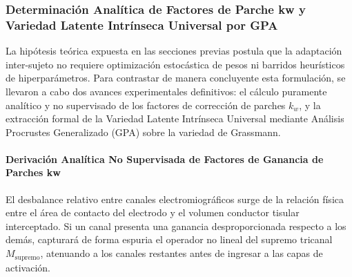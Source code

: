 \documentclass[11pt,a4paper]{article}
\begin{document}
\subsubsection{Determinación Analítica de Factores de Parche kw y Variedad Latente Intrínseca Universal por GPA}
\label{subsubsec:kw_analitico_y_variedad_gpa}

La hipótesis teórica expuesta en las secciones previas postula que la adaptación inter-sujeto no requiere optimización estocástica de pesos ni barridos heurísticos de hiperparámetros. Para contrastar de manera concluyente esta formulación, se llevaron a cabo dos avances experimentales definitivos: el cálculo puramente analítico y no supervisado de los factores de corrección de parches $k_w$, y la extracción formal de la Variedad Latente Intrínseca Universal mediante Análisis Procrustes Generalizado (GPA) sobre la variedad de Grassmann.

\paragraph{Derivación Analítica No Supervisada de Factores de Ganancia de Parches kw}
El desbalance relativo entre canales electromiográficos surge de la relación física entre el área de contacto del electrodo y el volumen conductor tisular interceptado. Si un canal presenta una ganancia desproporcionada respecto a los demás, capturará de forma espuria el operador no lineal del supremo tricanal $M_{\text{supremo}}$, atenuando a los canales restantes antes de ingresar a las capas de activación.
\end{document}
